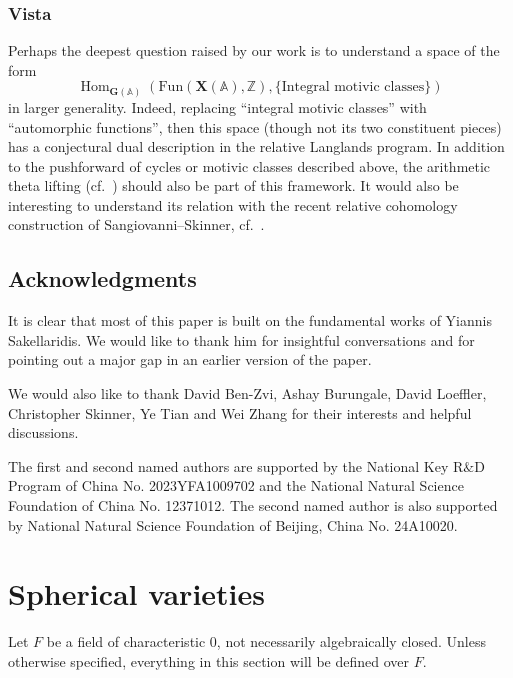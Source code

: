 \documentclass{amsart}
\theoremstyle{definition}
\theoremstyle{remark}
\newcommand{\1}{\mathbf{1}}
\newcommand{\A}{\mathbb{A}}
\newcommand{\mb}[1]{\mathbf{#1}}
\newcommand{\Z}{\mathbb{Z}}
\DeclareMathOperator{\Hom}{Hom}
\theoremstyle{definition}
\newcommand{\bG}{\mathbf{G}}
\begin{document}
\subsubsection{Vista}
Perhaps the deepest question raised by our work is to understand a space of the form
\[
    \Hom_{\bG(\A)}(\mathrm{Fun}(\mb{X}(\A),\Z),\{\text{Integral motivic classes}\})
\]
in larger generality. Indeed, replacing ``integral motivic classes'' with ``automorphic functions'', then this space (though not its two constituent pieces) has a conjectural dual description in the relative Langlands program. In addition to the pushforward of cycles or motivic classes described above, the arithmetic theta lifting (cf.~\cite{LiuATL-I, LL2021, DisegniES}) should also be part of this framework. It would also be interesting to understand its relation with the recent relative cohomology construction of Sangiovanni--Skinner, cf.~\cite{SkinnerMarco}.

\subsection*{Acknowledgments}
It is clear that most of this paper is built on the fundamental works of Yiannis Sakellaridis. We would like to thank him for insightful conversations and for pointing out a major gap in an earlier version of the paper.

We would also like to thank David Ben-Zvi, Ashay Burungale, David Loeffler, Christopher Skinner, Ye Tian and Wei Zhang for their interests and helpful discussions.

The first and second named authors are  supported by the National Key R$\&$D Program of China No. 2023YFA1009702 and the National Natural Science Foundation of China No. 12371012. The second named author is also supported by  National Natural Science Foundation of Beijing, China No. 24A10020.

\section{Spherical varieties}\label{sec:Spherical}
Let $F$ be a field of characteristic 0, not necessarily algebraically closed. Unless otherwise specified, everything in this section will be defined over $F$.
\end{document}
